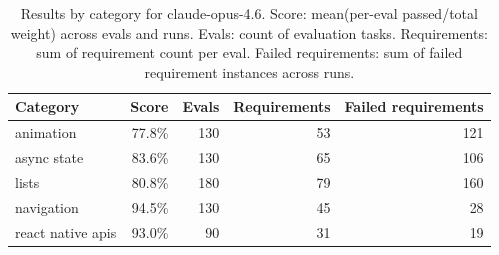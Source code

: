 \begin{table}[htbp]
\centering
\begin{tabular}{lrrrr}
\toprule
Category & Score & Evals & Requirements & Failed requirements \\
\midrule
animation & 77.8\% & 130 & 53 & 121 \\
async state & 83.6\% & 130 & 65 & 106 \\
lists & 80.8\% & 180 & 79 & 160 \\
navigation & 94.5\% & 130 & 45 & 28 \\
react native apis & 93.0\% & 90 & 31 & 19 \\
\bottomrule
\end{tabular}
\caption{Results by category for claude-opus-4.6. Score: mean(per-eval passed/total weight) across evals and runs. Evals: count of evaluation tasks. Requirements: sum of requirement count per eval. Failed requirements: sum of failed requirement instances across runs.}
\end{table}
